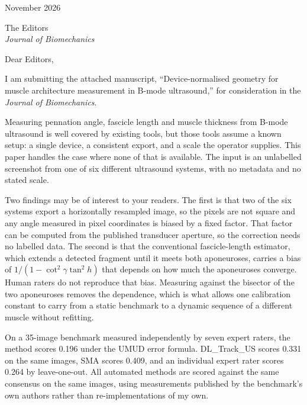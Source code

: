 \documentclass[11pt]{article}
\begin{document}
 November 2026
\vspace{1.5em}

\noindent The Editors\\
\textit{Journal of Biomechanics}
\vspace{1.5em}

\noindent Dear Editors,
\vspace{1em}

\noindent I am submitting the attached manuscript, ``Device-normalised geometry for
muscle architecture measurement in B-mode ultrasound,'' for consideration in the
\textit{Journal of Biomechanics}.
\vspace{1em}

\noindent Measuring pennation angle, fascicle length and muscle thickness from B-mode
ultrasound is well covered by existing tools, but those tools assume a known
setup: a single device, a consistent export, and a scale the operator supplies.
This paper handles the case where none of that is available. The input is an
unlabelled screenshot from one of six different ultrasound systems, with no
metadata and no stated scale.
\vspace{1em}

\noindent Two findings may be of interest to your readers. The first is that two of the six
systems export a horizontally resampled image, so the pixels are not square and
any angle measured in pixel coordinates is biased by a fixed factor. That factor
can be computed from the published transducer aperture, so the correction needs
no labelled data. The second is that the conventional fascicle-length estimator,
which extends a detected fragment until it meets both aponeuroses, carries a bias
of $1/(1-\cot^{2}\gamma\tan^{2}h)$ that depends on how much the aponeuroses
converge. Human raters do not reproduce that bias. Measuring against the bisector
of the two aponeuroses removes the dependence, which is what allows one
calibration constant to carry from a static benchmark to a dynamic sequence of a
different muscle without refitting.
\vspace{1em}

\noindent On a 35-image benchmark measured independently by seven expert raters, the method
scores 0.196 under the UMUD error formula. DL\_Track\_US scores 0.331 on the same
images, SMA scores 0.409, and an individual expert rater scores 0.264 by
leave-one-out. All automated methods are scored against the same consensus on the
same images, using measurements published by the benchmark's own authors rather
than re-implementations of my own.
\vspace{1em}
\end{document}
